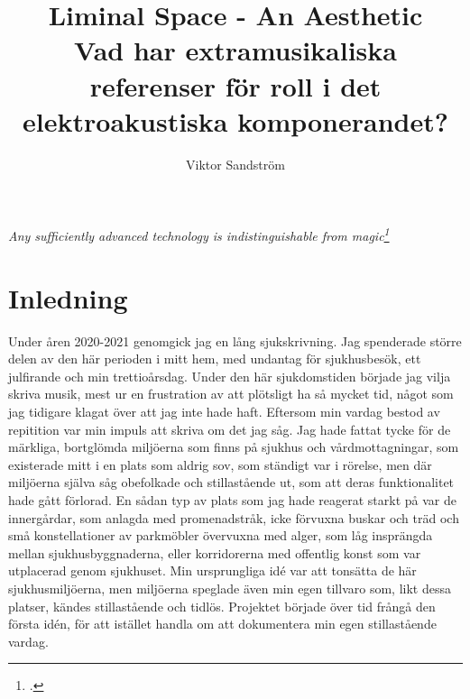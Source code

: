\documentclass{article}
\title{%
	Liminal Space - An Aesthetic \\
	\large{Vad har extramusikaliska referenser för roll i det elektroakustiska komponerandet?}
}
\author{Viktor Sandström}
\begin{document}
\maketitle
\newpage
\tableofcontents
\newpage



\begin{center}
	\hspace{0pt}
	\vfill
	\emph{Any sufficiently advanced technology is indistinguishable from magic\footcite{ArthurCClarkeMagic}}
	\vfill
	\hspace{0pt}
\end{center}
\newpage




\section{Inledning}

Under åren 2020-2021 genomgick jag en lång sjukskrivning. Jag spenderade större delen av den här perioden i
mitt hem, med undantag för sjukhusbesök, ett julfirande och min trettioårsdag. Under den här sjukdomstiden
började jag vilja skriva musik, mest ur en frustration av att plötsligt ha så mycket tid, något som jag tidigare
klagat över att jag inte hade haft. Eftersom min vardag bestod av repitition var min impuls att skriva om det jag
såg. Jag hade fattat tycke för de märkliga, bortglömda miljöerna som finns på sjukhus och vårdmottagningar,
som existerade mitt i en plats som aldrig sov, som ständigt var i rörelse, men där miljöerna själva såg
obefolkade och stillastående ut, som att deras funktionalitet hade gått förlorad. En sådan typ av plats som
jag hade reagerat starkt på var de innergårdar, som anlagda med promenadstråk, icke förvuxna buskar och träd
och små konstellationer av parkmöbler övervuxna med alger, som låg insprängda mellan sjukhusbyggnaderna, eller
korridorerna med offentlig konst som var utplacerad genom sjukhuset. Min ursprungliga idé var att tonsätta de
här sjukhusmiljöerna, men miljöerna speglade även min egen tillvaro som, likt dessa platser, kändes
stillastående och tidlös. Projektet började över tid frångå den första idén, för att istället handla om att
dokumentera min egen stillastående vardag.
\end{document}

